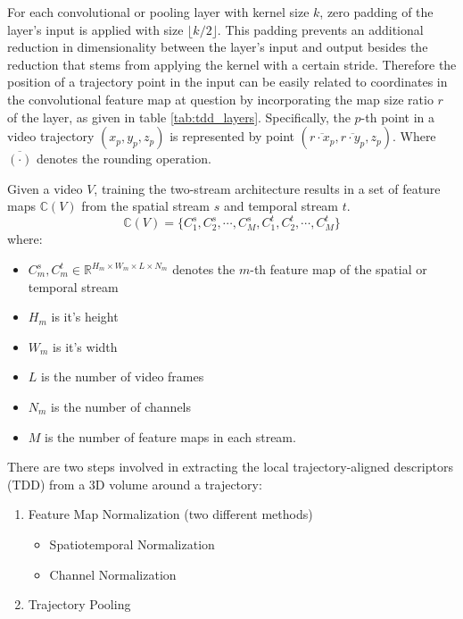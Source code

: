 
For each convolutional or pooling layer with kernel size $k$, zero padding of the layer's input is applied with size $\lfloor k/2 \rfloor$.
This padding prevents an additional reduction in dimensionality between the layer's input and output besides the reduction that stems from applying the kernel with a certain stride.
Therefore the position of a trajectory point in the input can be easily related to coordinates in the convolutional feature map at question by incorporating the map size ratio $r$ of the layer, as given in table \ref{tab:tdd_layers}.
Specifically, the $p$-th point in a video trajectory $(x_p, y_p, z_p)$ is represented by point $(\overline{r \cdot x_p}, \overline{r \cdot y_p}, z_p)$.
Where $\overline{(\cdot)}$ denotes the rounding operation.

Given a video $V$, training the two-stream architecture results in a set of feature maps $\mathbb{C}(V)$ from the spatial stream $s$ and temporal stream $t$.
\begin{equation*}
    \mathbb{C}(V) = \{C_1^s, C_2^s, \cdots, C_M^s, C_1^t, C_2^t, \cdots, C_M^t\}
\end{equation*}
where:
\begin{itemize}
    \item $C_m^s, C_m^t \in \mathbb{R}^{H_m \times W_m \times L \times N_m}$ denotes the $m$-th feature map of the spatial or temporal stream
    \item $H_m$ is it's height
    \item $W_m$ is it's width
    \item $L$ is the number of video frames
    \item $N_m$ is the number of channels
    \item $M$ is the number of feature maps in each stream.
\end{itemize}

There are two steps involved in extracting the local trajectory-aligned descriptors (TDD) from a 3D volume around a trajectory:
\begin{enumerate}
    \item Feature Map Normalization (two different methods)
        \begin{itemize}
            \item Spatiotemporal Normalization
            \item Channel Normalization
        \end{itemize}
    \item Trajectory Pooling
\end{enumerate}

